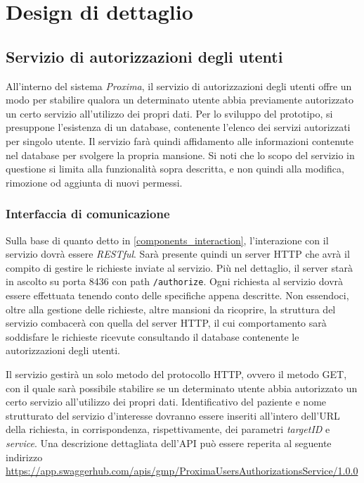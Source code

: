 \documentclass[a4paper,12pt]{report}
\begin{document}
\chapter{Design di dettaglio}

\section{Servizio di autorizzazioni degli utenti} \label{users_authorizations_design}

All'interno del sistema \emph{Proxima}, il servizio di autorizzazioni degli utenti offre un modo per stabilire qualora un determinato utente abbia previamente autorizzato un certo servizio all'utilizzo dei propri dati. Per lo sviluppo del prototipo, si presuppone l'esistenza di un database, contenente l'elenco dei servizi autorizzati per singolo utente. Il servizio farà quindi affidamento alle informazioni contenute nel database per svolgere la propria mansione. Si noti che lo scopo del servizio in questione si limita alla funzionalità sopra descritta, e non quindi alla modifica, rimozione od aggiunta di nuovi permessi. 

\subsection{Interfaccia di comunicazione}

Sulla base di quanto detto in \autoref{components_interaction}, l'interazione con il servizio dovrà essere \emph{RESTful}. Sarà presente quindi un server HTTP che avrà il compito di gestire le richieste inviate al servizio. Più nel dettaglio, il server starà in ascolto su porta 8436 con path \texttt{/authorize}. Ogni richiesta al servizio dovrà essere effettuata tenendo conto delle specifiche appena descritte. Non essendoci, oltre alla gestione delle richieste, altre mansioni da ricoprire, la struttura del servizio combacerà con quella del server HTTP, il cui comportamento sarà soddisfare le richieste ricevute consultando il database contenente le autorizzazioni degli utenti.

Il servizio gestirà un solo metodo del protocollo HTTP, ovvero il metodo GET, con il quale sarà possibile stabilire se un determinato utente abbia autorizzato un certo servizio all'utilizzo dei propri dati. Identificativo del paziente e nome strutturato del servizio d'interesse dovranno essere inseriti all'intero dell'URL della richiesta, in corrispondenza, rispettivamente, dei parametri \emph{targetID} e \emph{service}. Una descrizione dettagliata dell'API può essere reperita al seguente indirizzo \url{https://app.swaggerhub.com/apis/gmp/ProximaUsersAuthorizationsService/1.0.0}
\end{document}
